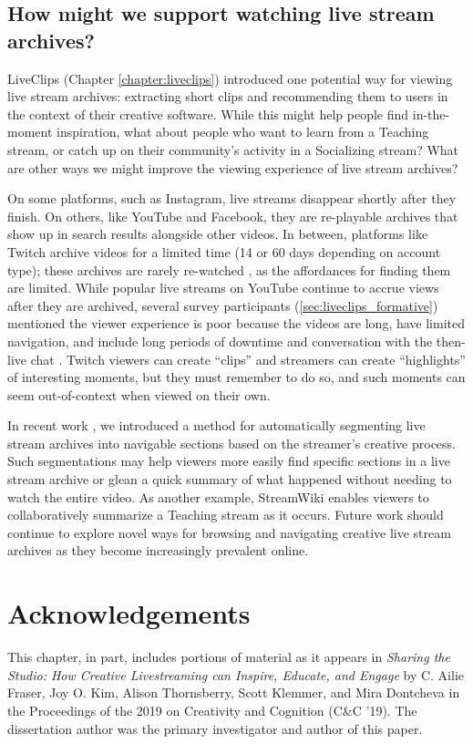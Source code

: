 \subsection{How might we support watching live stream archives?}
LiveClips (Chapter \ref{chapter:liveclips}) introduced one potential way for viewing live stream archives: extracting short clips and recommending them to users in the context of their creative software. While this might help people find in-the-moment inspiration, what about people who want to learn from a Teaching stream, or catch up on their community's activity in a Socializing stream? What are other ways we might improve the viewing experience of live stream archives?

On some platforms, such as Instagram, live streams disappear shortly after they finish. On others, like YouTube and Facebook, they are re-playable archives that show up in search results alongside other videos. In between, platforms like Twitch archive videos for a limited time (14 or 60 days depending on account type); these archives are rarely re-watched  \cite{Jia2016}, as the affordances for finding them are limited.
While popular live streams on YouTube continue to accrue views after they are archived, several survey participants (\autoref{sec:liveclips_formative}) mentioned the viewer experience is poor because the videos are long, have limited navigation, and include long periods of downtime and conversation with the then-live chat \cite{Lu2018}. Twitch viewers can create ``clips'' and streamers can create ``highlights'' of interesting moments, but they must remember to do so, and such moments can seem out-of-context when viewed on their own.

In recent work \cite{Fraser2020}, we introduced a method for automatically segmenting live stream archives into navigable sections based on the streamer's creative process. Such segmentations may help viewers more easily find specific sections in a live stream archive or glean a quick summary of what happened without needing to watch the entire video. As another example, StreamWiki \cite{Lu2018} enables viewers to collaboratively summarize a Teaching stream as it occurs. Future work should continue to explore novel ways for browsing and navigating creative live stream archives as they become increasingly prevalent online.

\section{Acknowledgements}
This chapter, in part, includes portions of material as it appears in \textit{Sharing the Studio: How Creative Livestreaming can Inspire, Educate, and Engage} by C. Ailie Fraser, Joy O. Kim, Alison Thornsberry, Scott Klemmer, and Mira Dontcheva in the Proceedings of the 2019 on Creativity and Cognition (C\&C '19). The dissertation author was the primary investigator and author of this paper.